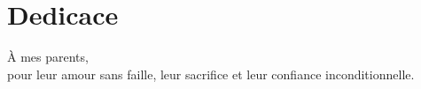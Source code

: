 \section*{Dedicace}
\thispagestyle{empty}

\vspace*{5cm}

\begin{flushright}
  \begin{center}
  	À mes parents,\\
  	pour leur amour sans faille, leur sacrifice et leur confiance inconditionnelle.
  \end{center}
\end{flushright}
